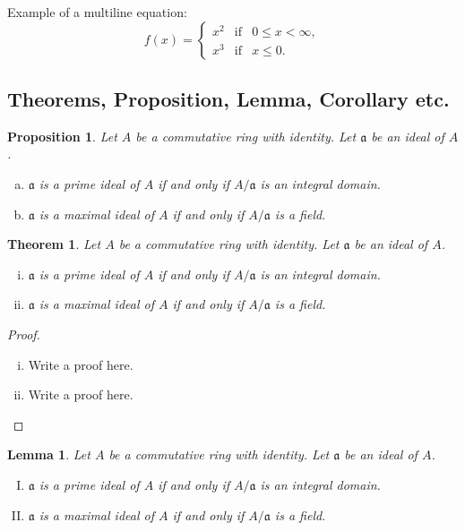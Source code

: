 \documentclass[11pt,a4paper,leqno]{article}
\numberwithin{equation}{subsection}
\newtheorem{theorem}[equation]{Theorem}
\newtheorem{lemma}[equation]{Lemma}
\newtheorem{proposition}[equation]{Proposition}
\theoremstyle{definition}
\begin{document}
\noindent
Example of a multiline equation: 
\begin{equation}
	f(x) = \left\{\begin{array}{rcl}
	x^2 & \mbox{if} & 0 \leq x < \infty, \\ 
	x^3 & \mbox{if} & x \leq 0. 
	\end{array}\right. 
\end{equation}


\subsection{Theorems, Proposition, Lemma, Corollary etc.}

\begin{proposition}\label{prop-1}
	Let $A$ be a commutative ring with identity. Let $\mathfrak a$ be an ideal of $A$. 
	\begin{enumerate}[(a)]
		\item $\mathfrak a$ is a prime ideal of $A$ if and only if $A/\mathfrak a$ is an integral domain. 
		\item $\mathfrak a$ is a maximal ideal of $A$ if and only if $A/\mathfrak a$ is a field. 
	\end{enumerate}
\end{proposition}


\begin{theorem}
	Let $A$ be a commutative ring with identity. Let $\mathfrak a$ be an ideal of $A$. 
	\begin{enumerate}[(i)]
		\item $\mathfrak a$ is a prime ideal of $A$ if and only if $A/\mathfrak a$ is an integral domain. 
		\item $\mathfrak a$ is a maximal ideal of $A$ if and only if $A/\mathfrak a$ is a field. 
	\end{enumerate}
\end{theorem}

\begin{proof}
	\begin{enumerate}[(i)]
		\item Write a proof here. 
		
		\item Write a proof here. 
	\end{enumerate}
\end{proof}

\begin{lemma}
	Let $A$ be a commutative ring with identity. Let $\mathfrak a$ be an ideal of $A$. 
	\begin{enumerate}[(I)]
		\item $\mathfrak a$ is a prime ideal of $A$ if and only if $A/\mathfrak a$ is an integral domain. 
		\item $\mathfrak a$ is a maximal ideal of $A$ if and only if $A/\mathfrak a$ is a field. 
	\end{enumerate}
\end{lemma}
\end{document}
